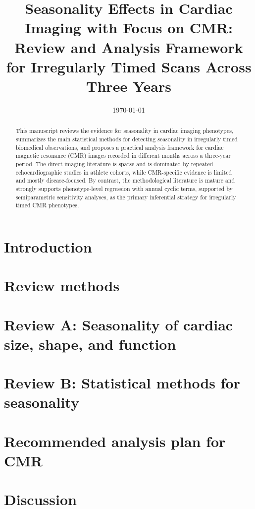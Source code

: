 \documentclass[11pt]{article}
\title{Seasonality Effects in Cardiac Imaging with Focus on CMR: Review and Analysis Framework for Irregularly Timed Scans Across Three Years}
\author{}
\date{\today}
\begin{document}
\maketitle

\begin{abstract}
This manuscript reviews the evidence for seasonality in cardiac imaging phenotypes, summarizes the main statistical methods for detecting seasonality in irregularly timed biomedical observations, and proposes a practical analysis framework for cardiac magnetic resonance (CMR) images recorded in different months across a three-year period. The direct imaging literature is sparse and is dominated by repeated echocardiographic studies in athlete cohorts, while CMR-specific evidence is limited and mostly disease-focused. By contrast, the methodological literature is mature and strongly supports phenotype-level regression with annual cyclic terms, supported by semiparametric sensitivity analyses, as the primary inferential strategy for irregularly timed CMR phenotypes.
\end{abstract}

\section{Introduction}


\section{Review methods}


\section{Review A: Seasonality of cardiac size, shape, and function}


\section{Review B: Statistical methods for seasonality}


\section{Recommended analysis plan for CMR}


\section{Discussion}




\end{document}
